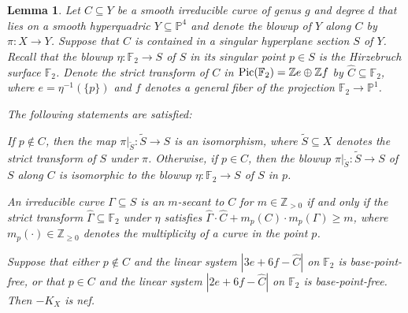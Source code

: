 \documentclass[english,11pt,reqno]{amsart}
\newcommand{\sub}{\subseteq}
\newcommand{\Pone}{\mathbb{P}^1}
\newcommand{\Pfour}{\mathbb{P}^4}
\newcommand{\Z}{\mathbb{Z}}
\newcommand{\Pic}{\textup{Pic}}
\newcommand{\Ftwo}{\mathbb{F}_2}
\newtheorem{lem}[thm]{Lemma}
\begin{document}
\begin{lem} \label{lem:singular_hyperplane_section_p_not_in_C}
Let $C \sub Y$ be a smooth irreducible curve of genus $g$ and degree $d$ that lies on a smooth hyperquadric $Y \sub \Pfour$ and denote the blowup of $Y$ along $C$ by $\pi:X\rightarrow Y$. Suppose that $C$ is contained in a singular hyperplane section $S$ of $Y$. Recall that the blowup $\eta:\Ftwo \rightarrow S$ of $S$ in its singular point $p\in S$ is the Hirzebruch surface $\Ftwo$. Denote the strict transform of $C$ in $\Pic(\Ftwo)=\Z e \oplus \Z f$ by $\hat{C}\sub \Ftwo$, where $e=\eta^{-1}(\{p\})$ and $f$ denotes a general fiber of the projection $\Ftwo \rightarrow \Pone$.\par 
The following statements are satisfied:
\begin{enumlem}
\item If $p\not \in C$, then the map $\pi|_{\widetilde{S}} : \widetilde{S} \rightarrow S$ is an isomorphism, where $\widetilde{S}\sub X$ denotes the strict transform of $S$ under $\pi$. Otherwise, if $p\in C$, then the blowup $\pi|_{\widetilde{S}} : \widetilde{S} \rightarrow S$ of $S$ along $C$ is isomorphic to the blowup $\eta:\Ftwo\rightarrow S$ of $S$ in $p$. \label{lem:singular_hyperplane_section_p_pi}
\item An irreducible curve $\Gamma \sub S$ is an $m$-secant to $C$ for $m\in \Z_{>0}$ if and only if the strict transform $\hat{\Gamma} \sub \Ftwo$ under $\eta$ satisfies $\hat{\Gamma}\cdot \hat{C} + m_p(C) \cdot m_p(\Gamma)\geq m$, where $m_p(\cdot) \in \Z_{\geq 0}$ denotes the multiplicity of a curve in the point $p$.  \label{lem:singular_hyperplane_section_m_secant}
\item Suppose that either $p\not \in C$ and the linear system $|3e+6f-\hat{C}|$ on $\Ftwo$ is base-point-free, or that $p\in C$ and the linear system $|2e+6f-\hat{C}|$ on $\Ftwo$ is base-point-free. Then $-K_X$ is nef.  \label{lem:singular_hyperplane_section_weak_Fano}
\end{enumlem}
\end{lem} 
%
\end{document}
